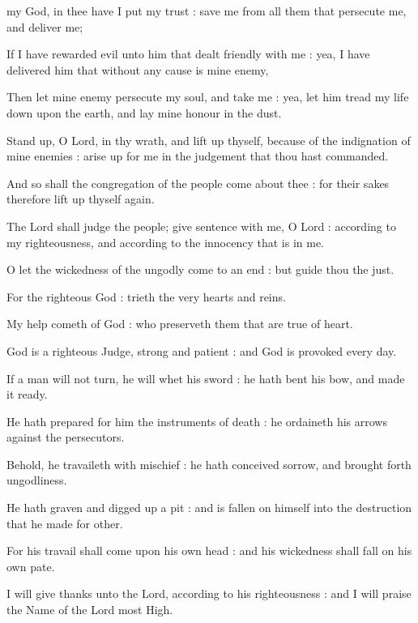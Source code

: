  my God, in thee have I put my trust : save me from all them that persecute me, and deliver me;\par
{}
If I have rewarded evil unto him that dealt friendly with me : yea, I have delivered him that without any cause is mine enemy,\par
{}Then let mine enemy persecute my soul, and take me : yea, let him tread my life down upon the earth, and lay mine honour in the dust.\par
{}Stand up, O Lord, in thy wrath, and lift up thyself, because of the indignation of mine enemies : arise up for me in the judgement that thou hast commanded.\par
{}And so shall the congregation of the people come about thee : for their sakes therefore lift up thyself again.\par
{}The Lord shall judge the people; give sentence with me, O Lord : according to my righteousness, and according to the innocency that is in me.\par
{}O let the wickedness of the ungodly come to an end : but guide thou the just.\par
{}For the righteous God : trieth the very hearts and reins.\par
{}My help cometh of God : who preserveth them that are true of heart.\par
{}God is a righteous Judge, strong and patient : and God is provoked every day.\par
{}If a man will not turn, he will whet his sword : he hath bent his bow, and made it ready.\par
{}He hath prepared for him the instruments of death : he ordaineth his arrows against the persecutors.\par
{}Behold, he travaileth with mischief : he hath conceived sorrow, and brought forth ungodliness.\par
{}He hath graven and digged up a pit : and is fallen on himself into the destruction that he made for other.\par
{}For his travail shall come upon his own head : and his wickedness shall fall on his own pate.\par
{}I will give thanks unto the Lord, according to his righteousness : and I will praise the Name of the Lord most High.\par

